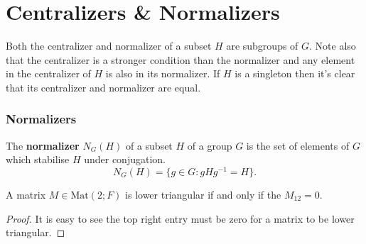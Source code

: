 \section{Centralizers \& Normalizers}

Both the centralizer and normalizer of a subset $H$ are subgroups of $G$. Note also that the centralizer is a stronger condition than the 
normalizer and any element in the centralizer of $H$ is also in its normalizer. If $H$ is a singleton then it's clear that its centralizer and normalizer are equal.\\

\subsubsection{Normalizers}

\begin{definition}
The \textbf{normalizer} $N_G(H)$ of a subset $H$ of a group $G$ is the set of elements of $G$ which stabilise $H$ under conjugation.
\begin{equation*} N_G(H) = \{ g \in G : gHg^{-1}=H\}. \end{equation*}
\end{definition}


\begin{corollary}
    \label{lower_triangular_iff_top_right_entry_eq_zero}
    \leanok
    A matrix $M \in \textrm{Mat}(2; F)$ is lower triangular if and only if the $M_{12} = 0$.
\end{corollary}
\begin{proof}
    \leanok
It is easy to see the top right entry must be zero for a matrix to be lower triangular.
\end{proof}


